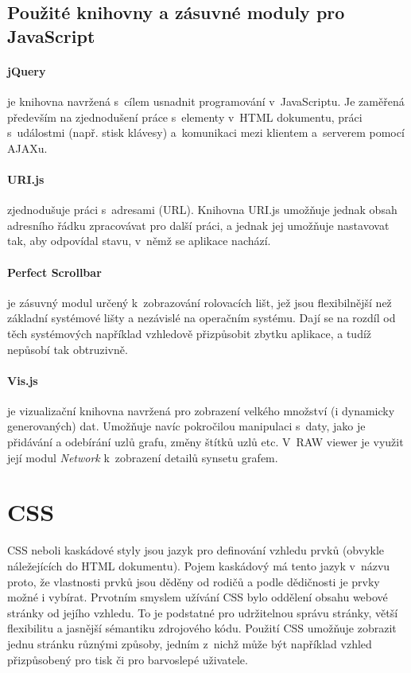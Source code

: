 \documentclass[a4paper,11pt,openany,twoside]{book}
\newcommand{\simplywn}{RAW viewer }
\begin{document}
				\subsection{Použité knihovny a zásuvné moduly pro JavaScript}

					\paragraph{jQuery} je knihovna navržená s~cílem usnadnit programování v~JavaScriptu. Je zaměřená především na zjednodušení práce s~elementy v~HTML dokumentu, práci s~událostmi (např. stisk klávesy) a~komunikaci mezi klientem a~serverem pomocí AJAXu. \parencite{jqueryWeb}

					\paragraph{URI.js} zjednodušuje práci s~adresami (URL). Knihovna URI.js umožňuje jednak obsah adresního řádku zpracovávat pro další práci, a jednak jej umožňuje nastavovat tak, aby odpovídal stavu, v~němž se aplikace nachází. \parencite{urijsWeb}

					\paragraph{Perfect Scrollbar} je zásuvný modul určený k~zobrazování rolovacích lišt, jež jsou flexibilnější než základní systémové lišty a nezávislé na operačním systému. Dají se na rozdíl od těch systémových například vzhledově přizpůsobit zbytku aplikace, a tudíž nepůsobí tak obtruzivně. \parencite{perfectScrollbarGithub}

					\paragraph{Vis.js} je vizualizační knihovna navržená pro zobrazení velkého množství (i dynamicky generovaných) dat. Umožňuje navíc pokročilou manipulaci s~daty, jako je přidávání a odebírání uzlů grafu, změny štítků uzlů etc. V~\simplywn je využit její modul \textit{Network} k~zobrazení detailů synsetu grafem. \parencite{visjWeb}

			\section{CSS}

				CSS neboli kaskádové styly jsou jazyk pro definování vzhledu prvků (obvykle náležejících do HTML dokumentu). Pojem kaskádový má tento jazyk v~názvu proto, že vlastnosti prvků jsou děděny od rodičů a podle dědičnosti je prvky možné i vybírat. Prvotním smyslem užívání CSS bylo oddělení obsahu webové stránky od jejího vzhledu. To je podstatné pro udržitelnou správu stránky, větší flexibilitu a jasnější sémantiku zdrojového kódu. Použití CSS umožňuje zobrazit jednu stránku různými způsoby, jedním z~nichž může být například vzhled přizpůsobený pro tisk či pro barvoslepé uživatele. \parencite{cssWeb}
\end{document}
